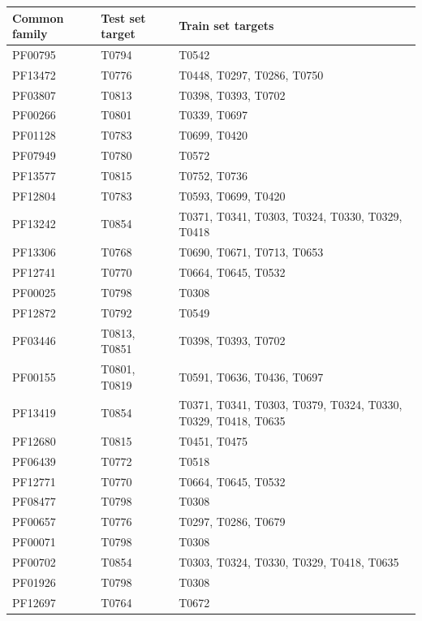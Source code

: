 \documentclass[letter,10pt]{article}
\begin{document}
\begin{table}[H]
\begin{center}
\begin{tabular}{ l | l | l }

    Common family & Test set target & Train set targets \\
    \hline
    PF00795 & T0794 & T0542 \\ \hline
    PF13472 & T0776 & T0448, T0297, T0286, T0750 \\ \hline
    PF03807 & T0813 & T0398, T0393, T0702 \\ \hline
    PF00266 & T0801 & T0339, T0697 \\ \hline
    PF01128 & T0783 & T0699, T0420 \\ \hline
    PF07949 & T0780 & T0572 \\ \hline
    PF13577 & T0815 & T0752, T0736 \\ \hline
    PF12804 & T0783 & T0593, T0699, T0420 \\ \hline
    PF13242 & T0854 & T0371, T0341, T0303, T0324, T0330, T0329, T0418 \\ \hline
    PF13306 & T0768 & T0690, T0671, T0713, T0653 \\ \hline
    PF12741 & T0770 & T0664, T0645, T0532 \\ \hline
    PF00025 & T0798 & T0308 \\ \hline
    PF12872 & T0792 & T0549 \\ \hline
    PF03446 & T0813, T0851 & T0398, T0393, T0702 \\ \hline
    PF00155 & T0801, T0819 & T0591, T0636, T0436, T0697 \\ \hline
    PF13419 & T0854 & T0371, T0341, T0303, T0379, T0324, T0330, T0329, T0418, T0635 \\ \hline
    PF12680 & T0815 & T0451, T0475 \\ \hline
    PF06439 & T0772 & T0518 \\ \hline
    PF12771 & T0770 & T0664, T0645, T0532 \\ \hline
    PF08477 & T0798 & T0308 \\ \hline
    PF00657 & T0776 & T0297, T0286, T0679 \\ \hline
    PF00071 & T0798 & T0308 \\ \hline
    PF00702 & T0854 & T0303, T0324, T0330, T0329, T0418, T0635 \\ \hline
    PF01926 & T0798 & T0308 \\ \hline
    PF12697 & T0764 & T0672 \\ \hline
\end{tabular}
   

\end{center}
\end{table}
\end{document}
